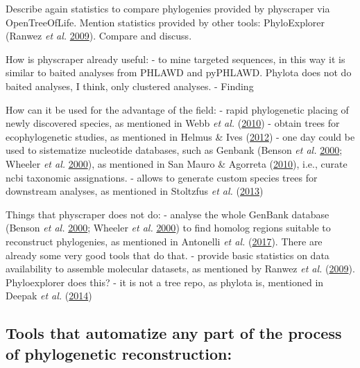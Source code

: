 \documentclass[]{article}
\begin{document}
Describe again statistics to compare phylogenies provided by physcraper via OpenTreeOfLife.
Mention statistics provided by other tools: PhyloExplorer (Ranwez \emph{et al.} \protect\hyperlink{ref-ranwez2009phyloexplorer}{2009}).
Compare and discuss.

How is physcraper already useful:
- to mine targeted sequences, in this way it is similar to baited analyses from PHLAWD and pyPHLAWD. Phylota does not do baited analyses, I think, only clustered analyses.
- Finding

How can it be used for the advantage of the field:
- rapid phylogenetic placing of newly discovered species, as mentioned in Webb \emph{et al.} (\protect\hyperlink{ref-webb2010biodiversity}{2010})
- obtain trees for ecophylogenetic studies, as mentioned in Helmus \& Ives (\protect\hyperlink{ref-helmus2012phylogenetic}{2012})
- one day could be used to sistematize nucleotide databases, such as Genbank (Benson \emph{et al.} \protect\hyperlink{ref-benson2000genbank}{2000}; Wheeler \emph{et al.} \protect\hyperlink{ref-wheeler2000database}{2000}), as mentioned in San Mauro \& Agorreta (\protect\hyperlink{ref-san2010molecular}{2010}), i.e., curate ncbi taxonomic assignations.
- allows to generate custom species trees for downstream analyses, as mentioned in Stoltzfus \emph{et al.} (\protect\hyperlink{ref-stoltzfus2013phylotastic}{2013})

Things that physcraper does not do:
- analyse the whole GenBank database (Benson \emph{et al.} \protect\hyperlink{ref-benson2000genbank}{2000}; Wheeler \emph{et al.} \protect\hyperlink{ref-wheeler2000database}{2000}) to find homolog regions suitable to reconstruct phylogenies, as mentioned in Antonelli \emph{et al.} (\protect\hyperlink{ref-antonelli2017toward}{2017}). There are already some very good tools that do that.
- provide basic statistics on data availability to assemble molecular datasets, as mentioned by Ranwez \emph{et al.} (\protect\hyperlink{ref-ranwez2009phyloexplorer}{2009}). Phyloexplorer does this?
- it is not a tree repo, as phylota is, mentioned in Deepak \emph{et al.} (\protect\hyperlink{ref-deepak2014evominer}{2014})

\hypertarget{tools-that-automatize-any-part-of-the-process-of-phylogenetic-reconstruction}{%
\subsection{Tools that automatize any part of the process of phylogenetic reconstruction:}\label{tools-that-automatize-any-part-of-the-process-of-phylogenetic-reconstruction}}
\end{document}
